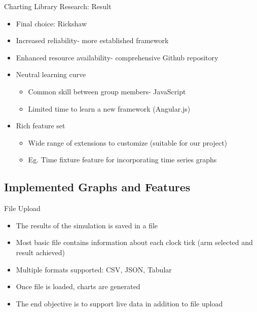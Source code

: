 \documentclass{beamer}
\begin{document}
\begin{frame}{Charting Library Research: Result}
\begin{itemize}
	\item Final choice: Rickshaw
	\item Increased reliability- more established framework
	\item Enhanced resource availability- comprehensive Github repository
	\item Neutral learning curve
		\begin{itemize}
			\item Common skill between group members- JavaScript
			\item Limited time to learn a new framework (Angular.js)
		\end{itemize}
	\item Rich feature set
		\begin{itemize}
			\item Wide range of extensions to customize (suitable for our project)
			\item Eg. Time fixture feature for incorporating time series graphs
		\end{itemize}
\end{itemize}
\end{frame}

\subsection{Implemented Graphs and Features}
\begin{frame}{File Upload}
 	\begin{itemize}
   		\item The results of the simulation is saved in a file
		\item Most basic file contains information about each clock tick (arm selected and result achieved)
		\item Multiple formats supported: CSV, JSON, Tabular
		\item Once file is loaded, charts are generated
		\item The end objective is to support live data in addition to file upload
	\end{itemize}
\end{frame}
\end{document}
